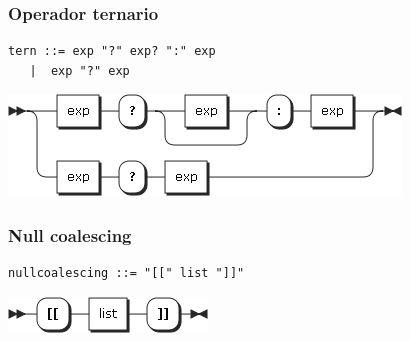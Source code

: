 \subsubsection{Operador ternario}
\begin{multicols}{2}
\begin{lstlisting}[style=nonumbers]      
tern ::= exp "?" exp? ":" exp
   |  exp "?" exp
\end{lstlisting}  
\columnbreak	
\begin{center}
\includegraphics[scale=0.5]{diagram/tern.png} \\
\end{center}
\end{multicols}
\subsubsection{Null coalescing}
\begin{multicols}{2}
\begin{lstlisting}[style=nonumbers]      
nullcoalescing ::= "[[" list "]]"
\end{lstlisting}  
\columnbreak	
\begin{center}
\includegraphics[scale=0.5]{diagram/nullcoalescing.png} \\
\end{center}
\end{multicols}

\pagebreak
